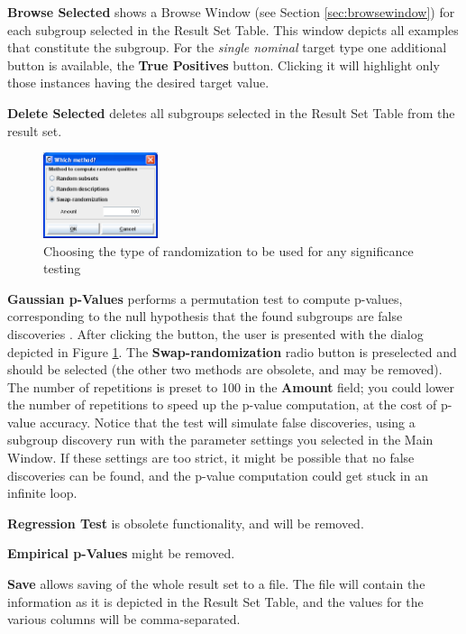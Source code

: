 \documentclass{article}
\begin{document}
\textbf{Browse Selected} shows a Browse Window (see Section \ref{sec:browsewindow}) for
each subgroup selected in the Result Set Table.  This window depicts all
examples that constitute the subgroup.  For the \emph{single nominal} target
type one additional button is available, the \textbf{True Positives} button. 
Clicking it will highlight only those instances having the desired target
value.

\textbf{Delete Selected} deletes all subgroups selected in the Result
Set Table from the result set.

\begin{figure}[t]
\begin{center}
\includegraphics[width=0.3\textwidth]{randomizationdialog.png}
\caption{Choosing the type of randomization to be used for any significance testing}
\end{center}
\label{fig:randomizationdialog}
\end{figure}

\textbf{Gaussian p-Values} performs a permutation test to compute
p-values, corresponding to the null hypothesis that the found subgroups are
false discoveries \cite{2011Duivesteijn}.  After clicking the button, the
user is presented with the dialog depicted in Figure
\ref{fig:randomizationdialog}.  The \textbf{Swap-randomization} radio button
is preselected and should be selected (the other two methods are obsolete,
and may be removed).  The number of repetitions is preset to 100 in the
\textbf{Amount} field; you could lower the number of repetitions to speed up
the p-value computation, at the cost of p-value accuracy.  Notice that the
test will simulate false discoveries, using a subgroup discovery run with
the parameter settings you selected in the Main Window.  If these settings
are too strict, it might be possible that no false discoveries can be found,
and the p-value computation could get stuck in an infinite loop.

\textbf{Regression Test} is obsolete functionality, and will be removed.

\textbf{Empirical p-Values} might be removed.

\textbf{Save} allows saving of the whole result set to a file.  The file
will contain the information as it is depicted in the Result Set Table, and
the values for the various columns will be comma-separated.
\end{document}
